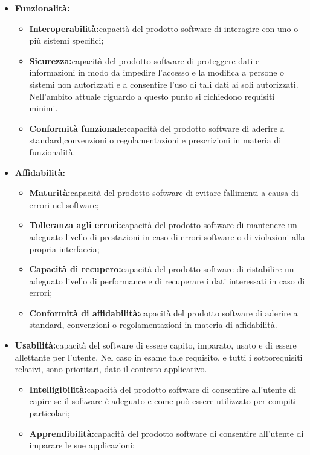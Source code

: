 \documentclass[12pt,a4paper]{article}
\begin{document}
\begin{itemize}
\item\textbf{Funzionalità:}
\begin{itemize}
\item\textbf{Interoperabilità:}capacità del prodotto software di interagire con uno o più sistemi specifici;
\item\textbf{Sicurezza:}capacità del prodotto software di proteggere dati e informazioni in modo da impedire l’accesso e la modifica a persone o sistemi non autorizzati e a consentire l’uso di tali dati ai soli autorizzati. Nell'ambito attuale riguardo a questo punto si richiedono requisiti minimi. 
\item\textbf{Conformità funzionale:}capacità del prodotto software di aderire a standard,convenzioni o regolamentazioni e prescrizioni in materia di funzionalità. 
\end{itemize}
\item\textbf{Affidabilità:}
\begin{itemize}
\item\textbf{Maturità:}capacità del prodotto software di evitare fallimenti a causa di errori nel software;
\item\textbf{Tolleranza agli errori:}capacità del prodotto software di mantenere un adeguato livello di prestazioni in caso di errori software o di violazioni alla propria interfaccia;
\item\textbf{Capacità di recupero:}capacità del prodotto software di ristabilire un adeguato livello di performance e di recuperare i dati interessati in caso di errori;
\item\textbf{Conformità di affidabilità:}capacità del prodotto software di aderire a standard, convenzioni o regolamentazioni in materia di affidabilità.

\end{itemize}
\item\textbf{Usabilità:}capacità del software di essere capito, imparato, usato e di essere allettante per l’utente. Nel caso in esame tale requisito, e tutti i sottorequisiti relativi, sono prioritari, dato il contesto applicativo.

\begin{itemize}
\item\textbf{Intelligibilità:}capacità del prodotto software di consentire all’utente di capire se il software è adeguato e come può essere utilizzato per compiti particolari;

\item\textbf{Apprendibilità:}capacità del prodotto software di consentire all’utente di imparare le sue applicazioni;


\end{itemize}
\end{itemize}
\end{document}
